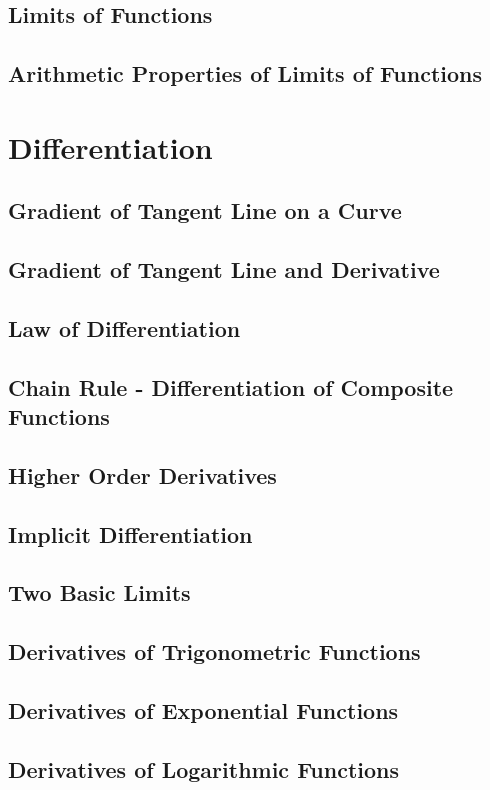 \documentclass{report}
\begin{document}
\begin{multicols}{2}
  \section{Limits of Functions}

  \section{Arithmetic Properties of Limits of Functions}

  \chapter{Differentiation}

  \section{Gradient of Tangent Line on a Curve}

  \section{Gradient of Tangent Line and Derivative}

  \section{Law of Differentiation}

  \section{Chain Rule - Differentiation of Composite Functions}

  \section{Higher Order Derivatives}

  \section{Implicit Differentiation}

  \section{Two Basic Limits}

  \section{Derivatives of Trigonometric Functions}

  \section{Derivatives of Exponential Functions}

  \section{Derivatives of Logarithmic Functions}

\end{multicols}
\end{document}
